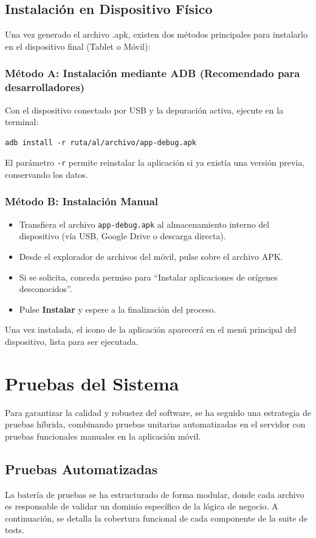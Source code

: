 \subsection{Instalación en Dispositivo Físico}
Una vez generado el archivo .apk, existen dos métodos principales para instalarlo en el dispositivo final (Tablet o Móvil):

\subsubsection*{Método A: Instalación mediante ADB (Recomendado para desarrolladores)}
Con el dispositivo conectado por USB y la depuración activa, ejecute en la terminal:
\begin{verbatim}
adb install -r ruta/al/archivo/app-debug.apk
\end{verbatim}
El parámetro \texttt{-r} permite reinstalar la aplicación si ya existía una versión previa, conservando los datos.

\subsubsection*{Método B: Instalación Manual}
\begin{itemize}
    \item Transfiera el archivo \texttt{app-debug.apk} al almacenamiento interno del dispositivo (vía USB, Google Drive o descarga directa).
    \item Desde el explorador de archivos del móvil, pulse sobre el archivo APK.
    \item Si se solicita, conceda permiso para ``Instalar aplicaciones de orígenes desconocidos''.
    \item Pulse \textbf{Instalar} y espere a la finalización del proceso.
\end{itemize}

Una vez instalada, el icono de la aplicación aparecerá en el menú principal del dispositivo, lista para ser ejecutada.

\section{Pruebas del Sistema}
Para garantizar la calidad y robustez del software, se ha seguido una estrategia de pruebas híbrida, combinando pruebas unitarias automatizadas en el servidor con pruebas funcionales manuales en la aplicación móvil.

\subsection{Pruebas Automatizadas}
La batería de pruebas se ha estructurado de forma modular, donde cada archivo es responsable de validar un dominio específico de la lógica de negocio. A continuación, se detalla la cobertura funcional de cada componente de la suite de tests.

